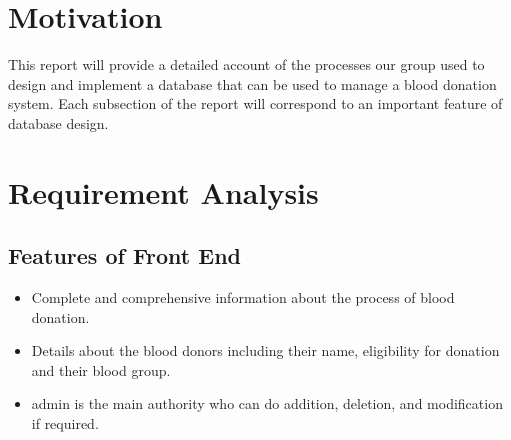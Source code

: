 




\section{Motivation}

This report will provide a detailed account of the processes our group
used to design and implement a database that can be used to manage
a blood donation system. Each subsection of the report will correspond to an
important feature of database design.

\section{Requirement Analysis}

\subsection{Features of Front End}
\begin{itemize}
  \item Complete and comprehensive information about the process of blood donation.
  \item Details about the blood donors including their name, eligibility for donation and their blood group.
  \item admin is the main authority who can do addition, deletion, and modification if required.
\end{itemize}

